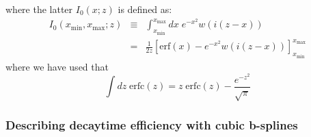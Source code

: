 \documentclass[a4paper,10pt,twosided]{article}
\begin{document}
where the latter $I_0(x;z)$ is defined as:
\begin{eqnarray*}
   I_0(x_\mathrm{min},x_\mathrm{max};z) &\equiv& \int_{x_\mathrm{min}}^{x_\mathrm{max}} dx\; e^{-x^2} w\left( i(z-x) \right) 
\\             &=&\frac{1}{2z}\left[ \mathrm{erf}\left(x\right) -e^{-x^2} w\left( i\left(z-x\right) \right) \right]_{x_\mathrm{min}}^{x_\mathrm{max}}
\end{eqnarray*}
where we have used that 
\begin{equation}
    \int dz\; \mathrm{erfc}(z) = z\; \mathrm{erfc}(z) - \frac{e^{-z^2}}{\sqrt{\pi}}
\end{equation}

\subsubsection{Describing decaytime efficiency with cubic b-splines}
\end{document}
